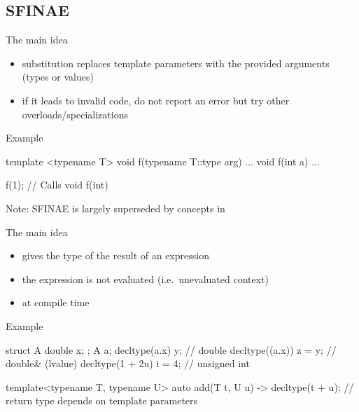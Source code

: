 \subsection[sfinae]{SFINAE}

\begin{frame}[fragile]
  \begin{block}{The main idea}
    \begin{itemize}
    \item substitution replaces template parameters with the provided arguments (types or values)
    \item if it leads to invalid code, do not report an error but try other overloads/specializations
    \end{itemize}
  \end{block}
  \begin{exampleblock}{Example}
    \begin{cppcode*}{}
      template <typename T>
      void f(typename T::type arg) { ... }
      void f(int a) { ... }

      f(1); // Calls void f(int)
    \end{cppcode*}
  \end{exampleblock}
  \begin{alertblock}{}
    Note: SFINAE is largely superseded by concepts in 
  \end{alertblock}
\end{frame}

\begin{frame}[fragile]
  \begin{block}{The main idea}
    \begin{itemize}
    \item gives the type of the result of an expression
    \item the expression is not evaluated (i.e.\ unevaluated context)
    \item at compile time
    \end{itemize}
  \end{block}
  \begin{exampleblock}{Example}
    \begin{cppcode*}{}
      struct A { double x; };
      A a;
      decltype(a.x) y;        // double
      decltype((a.x)) z = y;  // double& (lvalue)
      decltype(1 + 2u) i = 4; // unsigned int

      template<typename T, typename U>
      auto add(T t, U u) -> decltype(t + u);
      // return type depends on template parameters
    \end{cppcode*}
  \end{exampleblock}
\end{frame}

